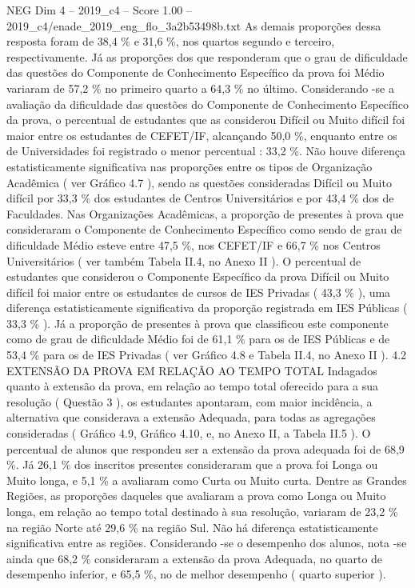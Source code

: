 \begin{textsample}{NEG Dim 4 – 2019\_c4 – Score 1.00 – 2019\_c4/enade\_2019\_eng\_flo\_3a2b53498b.txt}
As demais proporções dessa resposta foram de 38,4 \% e 31,6 \%, nos quartos segundo e terceiro, respectivamente.
Já as proporções dos que responderam que o grau de dificuldade das questões do Componente de Conhecimento Específico da prova foi Médio variaram de 57,2 \% no primeiro quarto a 64,3 \% no último.
Considerando -se a avaliação da dificuldade das questões do Componente de Conhecimento Específico da prova, o percentual de estudantes que as considerou Difícil ou Muito difícil foi maior entre os estudantes de CEFET/IF, alcançando 50,0 \%, enquanto entre os de Universidades foi registrado o menor percentual : 33,2 \%.
Não houve diferença estatisticamente significativa nas proporções entre os tipos de Organização Acadêmica ( ver Gráfico 4.7 ), sendo as questões consideradas Difícil ou Muito difícil por 33,3 \% dos estudantes de Centros Universitários e por 43,4 \% dos de Faculdades.
Nas Organizações Acadêmicas, a proporção de presentes à prova que consideraram o Componente de Conhecimento Específico como sendo de grau de dificuldade Médio esteve entre 47,5 \%, nos CEFET/IF e 66,7 \% nos Centros Universitários ( ver também Tabela II.4, no Anexo II ).
O percentual de estudantes que considerou o Componente Específico da prova Difícil ou Muito difícil foi maior entre os estudantes de cursos de IES Privadas ( 43,3 \% ), uma diferença estatisticamente significativa da proporção registrada em IES Públicas ( 33,3 \% ).
Já a proporção de presentes à prova que classificou este componente como de grau de dificuldade Médio foi de 61,1 \% para os de IES Públicas e de 53,4 \% para os de IES Privadas ( ver Gráfico 4.8 e Tabela II.4, no Anexo II ). 4.2 EXTENSÃO DA PROVA EM RELAÇÃO AO TEMPO TOTAL Indagados quanto à extensão da prova, em relação ao tempo total oferecido para a sua resolução ( Questão 3 ), os estudantes apontaram, com maior incidência, a alternativa que considerava a extensão Adequada, para todas as agregações consideradas ( Gráfico 4.9, Gráfico 4.10, e, no Anexo II, a Tabela II.5 ).
O percentual de alunos que respondeu ser a extensão da prova adequada foi de 68,9 \%.
Já 26,1 \% dos inscritos presentes consideraram que a prova foi Longa ou Muito longa, e 5,1 \% a avaliaram como Curta ou Muito curta.
Dentre as Grandes Regiões, as proporções daqueles que avaliaram a prova como Longa ou Muito longa, em relação ao tempo total destinado à sua resolução, variaram de 23,2 \% na região Norte até 29,6 \% na região Sul.
Não há diferença estatisticamente significativa entre as regiões.
Considerando -se o desempenho dos alunos, nota -se ainda que 68,2 \% consideraram a extensão da prova Adequada, no quarto de desempenho inferior, e 65,5 \%, no de melhor desempenho ( quarto superior ).

\end{textsample}
